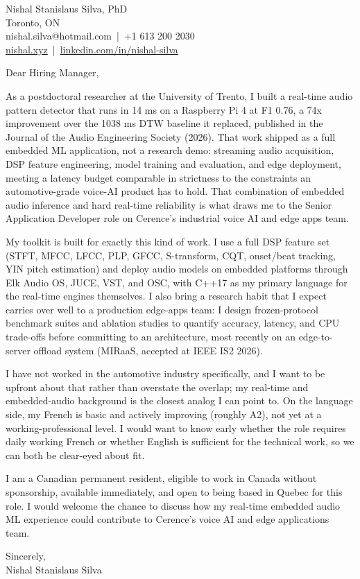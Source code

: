 \documentclass[11pt]{article}
\begin{document}
\pagestyle{empty}

\begin{flushleft}
Nishal Stanislaus Silva, PhD \\
Toronto, ON \\
nishal.silva@hotmail.com \,|\, +1 613 200 2030 \\
\href{https://nishal.xyz}{nishal.xyz} \,|\, \href{https://www.linkedin.com/in/nishal-silva}{linkedin.com/in/nishal-silva}
\end{flushleft}

\vspace{0.5em}
Dear Hiring Manager,

\vspace{0.5em}
As a postdoctoral researcher at the University of Trento, I built a real-time audio pattern detector that runs in 14 ms on a Raspberry Pi 4 at F1 0.76, a 74x improvement over the 1038 ms DTW baseline it replaced, published in the Journal of the Audio Engineering Society (2026). That work shipped as a full embedded ML application, not a research demo: streaming audio acquisition, DSP feature engineering, model training and evaluation, and edge deployment, meeting a latency budget comparable in strictness to the constraints an automotive-grade voice-AI product has to hold. That combination of embedded audio inference and hard real-time reliability is what draws me to the Senior Application Developer role on Cerence's industrial voice AI and edge apps team.

My toolkit is built for exactly this kind of work. I use a full DSP feature set (STFT, MFCC, LFCC, PLP, GFCC, S-transform, CQT, onset/beat tracking, YIN pitch estimation) and deploy audio models on embedded platforms through Elk Audio OS, JUCE, VST, and OSC, with C++17 as my primary language for the real-time engines themselves. I also bring a research habit that I expect carries over well to a production edge-apps team: I design frozen-protocol benchmark suites and ablation studies to quantify accuracy, latency, and CPU trade-offs before committing to an architecture, most recently on an edge-to-server offload system (MIRaaS, accepted at IEEE IS2 2026).

I have not worked in the automotive industry specifically, and I want to be upfront about that rather than overstate the overlap; my real-time and embedded-audio background is the closest analog I can point to. On the language side, my French is basic and actively improving (roughly A2), not yet at a working-professional level. I would want to know early whether the role requires daily working French or whether English is sufficient for the technical work, so we can both be clear-eyed about fit.

I am a Canadian permanent resident, eligible to work in Canada without sponsorship, available immediately, and open to being based in Quebec for this role. I would welcome the chance to discuss how my real-time embedded audio ML experience could contribute to Cerence's voice AI and edge applications team.

\vspace{1em}
Sincerely, \\
Nishal Stanislaus Silva
\end{document}
